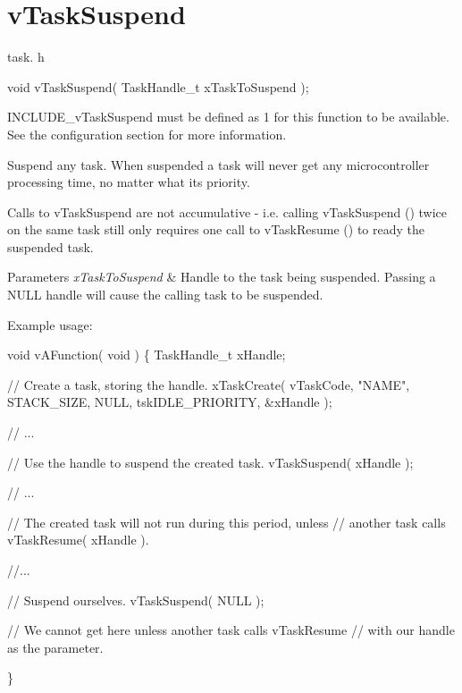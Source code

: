 \hypertarget{group__vTaskSuspend}{}\section{v\+Task\+Suspend}
\label{group__vTaskSuspend}
task. h 
\begin{DoxyPre}void vTaskSuspend( TaskHandle\_t xTaskToSuspend );\end{DoxyPre}


I\+N\+C\+L\+U\+D\+E\+\_\+v\+Task\+Suspend must be defined as 1 for this function to be available. See the configuration section for more information.

Suspend any task. When suspended a task will never get any microcontroller processing time, no matter what its priority.

Calls to v\+Task\+Suspend are not accumulative -\/ i.\+e. calling v\+Task\+Suspend () twice on the same task still only requires one call to v\+Task\+Resume () to ready the suspended task.


\begin{DoxyParams}{Parameters}
{\em x\+Task\+To\+Suspend} & Handle to the task being suspended. Passing a N\+U\+LL handle will cause the calling task to be suspended.\\
\hline
\end{DoxyParams}
Example usage\+: 
\begin{DoxyPre}
void vAFunction( void )
\{
TaskHandle\_t xHandle;
\begin{DoxyVerb}// Create a task, storing the handle.
xTaskCreate( vTaskCode, "NAME", STACK_SIZE, NULL, tskIDLE_PRIORITY, &xHandle );

// ...

// Use the handle to suspend the created task.
vTaskSuspend( xHandle );

// ...

// The created task will not run during this period, unless
// another task calls vTaskResume( xHandle ).

//...


// Suspend ourselves.
vTaskSuspend( NULL );

// We cannot get here unless another task calls vTaskResume
// with our handle as the parameter.
\end{DoxyVerb}

\}
  \end{DoxyPre}
 